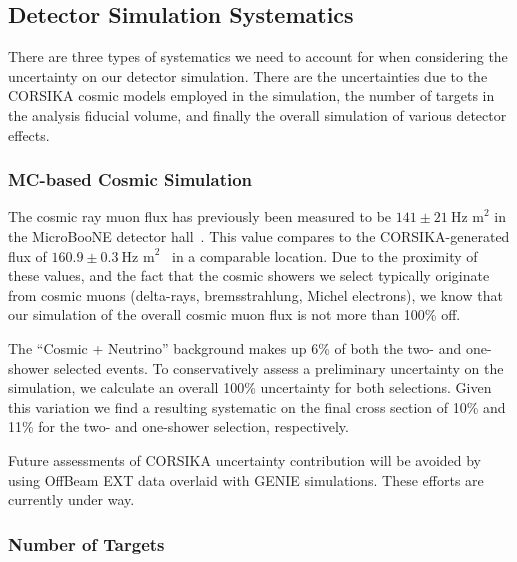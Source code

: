 \clearpage
\subsection{Detector Simulation Systematics}

There are three types of systematics we need to account for when considering the uncertainty on our detector simulation.  There are the uncertainties due to the CORSIKA cosmic models employed in the simulation, the number of targets in the analysis fiducial volume, and finally the overall simulation of various detector effects. 

\subsubsection{MC-based Cosmic Simulation}\label{sec:cosuncert}
 The cosmic ray muon flux has previously been measured to be $141\pm21~\text{Hz~m}^2$ in the MicroBooNE detector hall~\cite{datacosflux}.  This value compares to the CORSIKA-generated flux of $160.9\pm0.3~\text{Hz~m}^2$~\cite{mccosflux} in a comparable location.  Due to the proximity of these values, and the fact that the cosmic showers we select typically originate from cosmic muons (delta-rays, bremsstrahlung, Michel electrons), we know that our simulation of the overall cosmic muon flux is not more than 100\% off.
\par The ``Cosmic + Neutrino'' background makes up 6\% of both the two- and one-shower selected events. To conservatively assess a preliminary uncertainty on the simulation, we calculate an overall 100\% uncertainty for both selections. Given this variation we find a resulting systematic on the final cross section of 10\% and 11\% for the two- and one-shower selection, respectively. 
\par Future assessments of CORSIKA uncertainty contribution will be avoided by using OffBeam EXT data overlaid with GENIE simulations. These efforts are currently under way.
 
\subsubsection{Number of Targets}\label{sec:ntarguncert}


